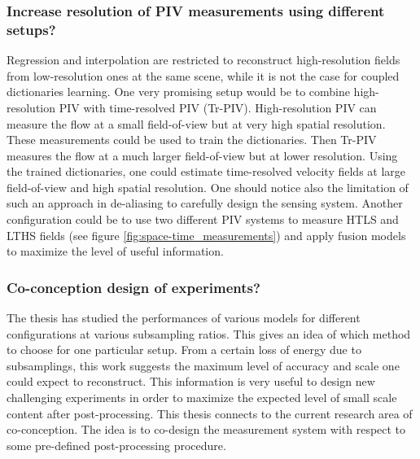 \subsubsection*{Increase resolution of PIV measurements using different setups?} Regression and interpolation are restricted to reconstruct high-resolution fields from low-resolution ones at the same scene, while it is not the case for coupled dictionaries learning. One very promising setup would be to combine high-resolution PIV with time-resolved PIV (Tr-PIV). High-resolution PIV can measure the flow at a small field-of-view but at very high spatial resolution. These measurements could be used to train the dictionaries. Then Tr-PIV measures the flow at a much larger field-of-view but at lower resolution. Using the trained dictionaries, one could estimate time-resolved velocity fields at large field-of-view and high spatial resolution. One should notice also the limitation of such an approach in de-aliasing to carefully design the sensing system. Another configuration could be to use two different PIV systems to measure HTLS and LTHS fields (see figure \ref{fig:space-time_measurements}) and apply fusion models to maximize the level of useful information.

\subsubsection*{Co-conception design of experiments?} The thesis has studied the performances of various models for different configurations at various subsampling ratios. This gives an idea of which method to choose for one particular setup. From a certain loss of energy due to subsamplings, this work suggests the maximum level of accuracy and scale one could expect to reconstruct. This information is very useful to design new challenging experiments in order to maximize the expected level of small scale content after post-processing. This thesis connects to the current research area of co-conception. The idea is to co-design the measurement system with respect to some pre-defined post-processing procedure. 